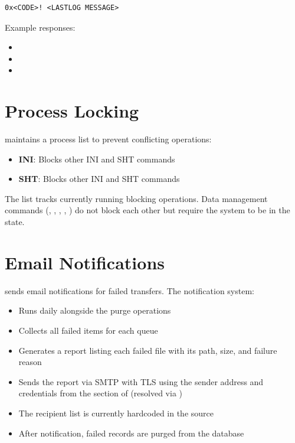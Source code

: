 \begin{lstlisting}[caption={Error Response Format}]
0x<CODE>! <LASTLOG MESSAGE>
\end{lstlisting}

Example responses:
\begin{itemize}
    \item {}
    \item {}
    \item {}
\end{itemize}

\section{Process Locking}

\SC{} maintains a process list to prevent conflicting operations:

\begin{itemize}
    \item \textbf{INI}: Blocks other INI and SHT commands
    \item \textbf{SHT}: Blocks other INI and SHT commands
\end{itemize}

The  list tracks currently running blocking operations. Data management commands (, , , , ) do not block each other but require the system to be in the  state.

\section{Email Notifications}

\SC{} sends email notifications for failed transfers. The notification system:

\begin{itemize}
    \item Runs daily alongside the purge operations
    \item Collects all failed items for each \DR{} queue
    \item Generates a report listing each failed file with its path, size, and failure reason
    \item Sends the report via SMTP with TLS using the sender address and credentials from the  section of  (resolved via )
    \item The recipient list is currently hardcoded in the source
    \item After notification, failed records are purged from the database
\end{itemize}

